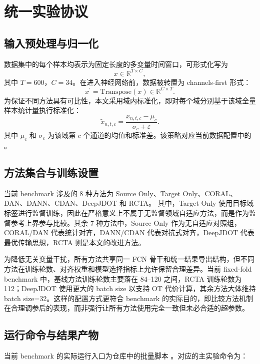 \section{统一实验协议}
\subsection{输入预处理与归一化}
数据集中的每个样本均表示为固定长度的多变量时间窗口，可形式化写为
\begin{equation}
x\in\mathbb{R}^{T\times C},
\end{equation}
其中 $T=600$，$C=34$。在进入神经网络前，数据被转置为 channels-first 形式：
\begin{equation}
x^\prime=\mathrm{Transpose}(x)\in\mathbb{R}^{C\times T}.
\end{equation}
为保证不同方法具有可比性，本文采用域内标准化，即对每个域分别基于该域全量样本统计量执行标准化：
\begin{equation}
\tilde{x}_{n,t,c}=\frac{x_{n,t,c}-\mu_c}{\sigma_c+\varepsilon}.
\end{equation}
其中 $\mu_c$ 和 $\sigma_c$ 为该域第 $c$ 个通道的均值和标准差。该策略对应当前数据配置中的 。

\subsection{方法集合与训练设置}
当前 benchmark 涉及的 8 种方法为 Source Only、Target Only、CORAL、DAN、DANN、CDAN、DeepJDOT 和 RCTA。
其中，Target Only 使用目标域标签进行监督训练，因此在严格意义上不属于无监督领域自适应方法，而是作为监督参考上界参与比较。其余 7 种方法中，Source Only 作为无自适应对照组，CORAL/DAN 代表统计对齐，DANN/CDAN 代表对抗式对齐，DeepJDOT 代表最优传输思想，RCTA 则是本文的改进方法。

为降低无关变量干扰，所有方法共享同一 FCN 骨干和统一结果导出结构，但不同方法在训练轮数、对齐权重和模型选择指标上允许保留合理差异。当前 fixed-fold benchmark 中，基线方法训练轮数主要落在 84--120 之间，RCTA 训练轮数为 112；DeepJDOT 使用更大的 batch size 以支持 OT 代价计算，其余方法大体维持 batch size=32。这样的配置方式更符合 benchmark 的实际目的，即比较方法机制在合理调参后的表现，而非强行让所有方法使用完全一致但未必合适的超参数。

\subsection{运行命令与结果产物}
当前 benchmark 的实际运行入口为仓库中的批量脚本
。对应的主实验命令为：

